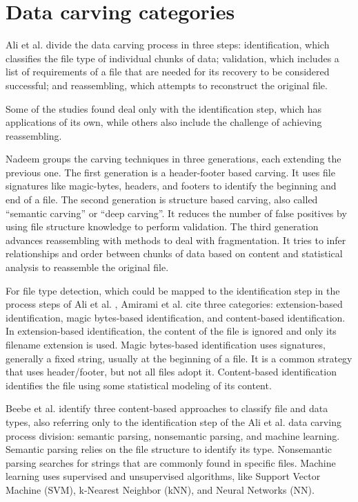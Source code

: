 \section{Data carving categories}
\label{sec:data-carving-taxonomies}

Ali et al. \cite{ali_review_2018} divide the data carving process in three steps:
    identification, which classifies the file type of individual chunks of data; 
    validation, which includes a list of requirements of a file that are needed for its recovery to be considered successful; and
    reassembling, which attempts to reconstruct the original file.

Some of the studies found deal only with the identification step, which has applications of its own, while others also include the challenge of achieving reassembling.

Nadeem \cite{nadeem_ashraf_forensic_2013} groups the carving techniques in three generations, each extending the previous one.
The first generation is a header-footer based carving. It uses file signatures like magic-bytes, headers, and footers to identify the beginning and end of a file.
The second generation is structure based carving, also called ``semantic carving'' or ``deep carving''. It reduces the number of false positives by using file structure knowledge to perform validation.
The third generation advances reassembling with methods to deal with fragmentation. It tries to infer relationships and order between chunks of data based on content and statistical analysis to reassemble the original file.

For file type detection, which could be mapped to the identification step in the  process steps of Ali et al. \cite{ali_review_2018}, Amirami et al. \cite{amirani_new_2008} cite three categories: extension-based identification, magic bytes-based identification, and content-based identification.
In extension-based identification, the content of the file is ignored and only its filename extension is used. Magic bytes-based identification uses signatures, generally a fixed string, usually at the beginning of a file. It is a common strategy that uses header/footer, but not all files adopt it. Content-based identification identifies the file using some statistical modeling of its content.

Beebe et al. \cite{beebe_sceadan:_2013} identify three content-based approaches to classify file and data types, also referring only to the identification step of the Ali et al. \cite{ali_review_2018} data carving process division: semantic parsing, nonsemantic parsing, and machine learning. Semantic parsing relies on the file structure to identify its type. Nonsemantic parsing searches for strings that are commonly found in specific files. Machine learning uses supervised and unsupervised algorithms, like Support Vector Machine (SVM), k-Nearest Neighbor (kNN), and Neural Networks (NN).

